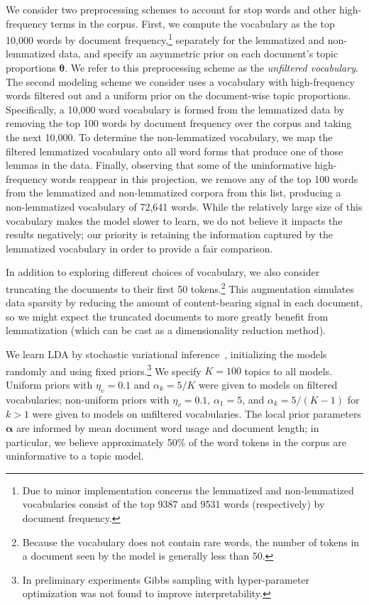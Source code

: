 \documentclass[11pt,letterpaper]{article}
\renewcommand{\vec}{\boldsymbol}   %
\newcommand{\valpha}{{\vec{\alpha}}}
\newcommand{\vtheta}{{\vec{\theta}}}
\begin{document}
{We consider two preprocessing schemes to account for stop words and
other high-frequency terms in the corpus.  First, we compute the
vocabulary as the top 10,000 words by document frequency,\footnote{
    Due to minor implementation concerns the lemmatized and
    non-lemmatized vocabularies consist of the top 9387 and 9531 words
    (respectively) by document frequency.
}
separately for the lemmatized and non-lemmatized data, and
specify an asymmetric prior on each document's topic proportions
$\vtheta$.
We refer to this preprocessing scheme
as the \emph{unfiltered vocabulary}.  The second modeling scheme we
consider uses a vocabulary with high-frequency words filtered out and a
uniform prior on the document-wise topic proportions.
Specifically, a 10,000 word vocabulary is formed from the
lemmatized data by removing the top 100 words by document frequency
over the corpus and taking the next 10,000.  To determine the
non-lemmatized vocabulary, we map the filtered lemmatized
vocabulary onto all word forms that produce one of those lemmas in
the data.  Finally, observing that some of the uninformative
high-frequency words reappear in this projection, we remove any
of the top 100 words from the lemmatized and non-lemmatized corpora
from this list, producing a non-lemmatized vocabulary of 72,641 words.
While the relatively large size of this vocabulary makes the model
slower to learn, we do not believe it impacts the results negatively;
our priority is retaining the information captured by the lemmatized
vocabulary in order to provide a fair comparison.

In addition to exploring different choices of vocabulary, we also
consider truncating the documents to their first 50 tokens.\footnote{
    Because the vocabulary does not contain rare words, the number of
    tokens in a document seen by the model is generally less than 50.
}
This augmentation simulates data sparsity by reducing the amount of
content-bearing signal in each document, so we might expect the
truncated documents to more greatly benefit from lemmatization (which
can be cast as a dimensionality reduction method).

We learn LDA by stochastic variational
inference~\cite{hoffman2013}, initializing the models randomly and
using fixed priors.\footnote{
    In preliminary experiments Gibbs
    sampling with hyper-parameter optimization was not found to improve
    interpretability.
}
We specify $K = 100$ topics to all models.
Uniform priors with $\eta_v = 0.1$ and
$\alpha_k = 5 / K$ were given to models on
filtered vocabularies; non-uniform priors with
$\eta_v = 0.1$, $\alpha_1 = 5$, and $\alpha_k = 5 / (K-1)$
for $k > 1$
were given to models on unfiltered vocabularies.
The local prior parameters $\valpha$ are informed by mean
document word usage and document length; in particular, we
believe approximately 50\% of the word tokens in the corpus are
uninformative to a topic model.

}
\end{document}
